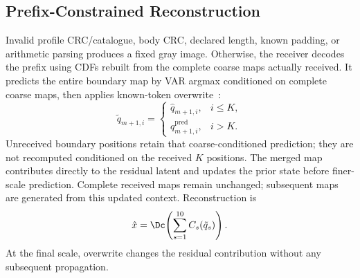 \subsection{Prefix-Constrained Reconstruction}
Invalid profile CRC/catalogue, body CRC, declared length, known padding, or arithmetic parsing produces a fixed gray image. Otherwise, the receiver decodes the prefix using CDFs rebuilt from the complete coarse maps actually received. It predicts the entire boundary map by VAR argmax conditioned on complete coarse maps, then applies known-token overwrite~\cite{var}:
\begin{equation}
 \tilde q_{m+1,i}=\begin{cases}\hat q_{m+1,i},&i\leq K,\\q^{\mathrm{pred}}_{m+1,i},&i>K.\end{cases}
 \label{eq:overwrite}
\end{equation}
Unreceived boundary positions retain that coarse-conditioned prediction; they are not recomputed conditioned on the received $K$ positions. The merged map contributes directly to the residual latent and updates the prior state before finer-scale prediction. Complete received maps remain unchanged; subsequent maps are generated from this updated context. Reconstruction is
\begin{equation}
 \hat x=\Dc\!\left(\sum_{s=1}^{10}C_s(\tilde q_s)\right).
 \label{eq:reconstruction}
\end{equation}
At the final scale, overwrite changes the residual contribution without any subsequent propagation.
